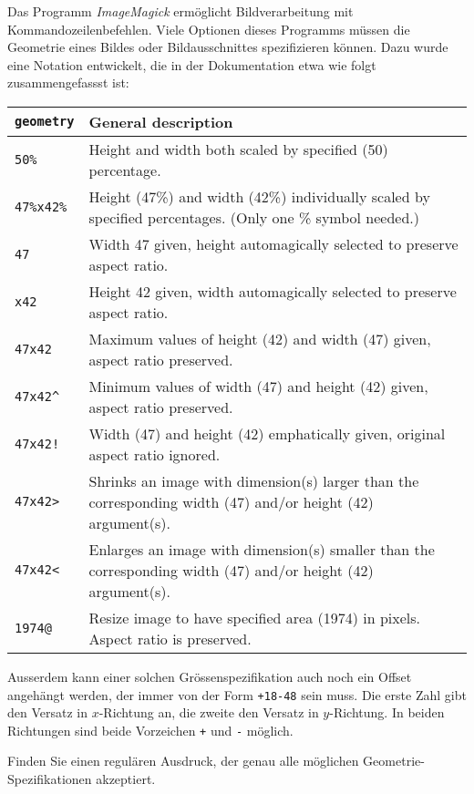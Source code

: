 Das Programm {\em ImageMagick} ermöglicht Bildverarbeitung mit
Kommandozeilenbefehlen. Viele Optionen dieses Programms müssen die
Geometrie eines Bildes oder Bildausschnittes spezifizieren können.
Dazu wurde eine Notation entwickelt, die in der Dokumentation etwa
wie folgt zusammengefassst ist:
\begin{center}
\begin{tabular}{>{\tt}lp{5.75in}}
\rm geometry&General description\\
\hline
50\%&Height and width both scaled by specified (50) percentage.\\
47\%x42\%&Height (47\%) and width (42\%) individually scaled by specified
percentages. (Only one \% symbol needed.)\\
47&Width 47 given, height automagically selected to preserve aspect ratio.\\
x42&Height 42 given, width automagically selected to preserve aspect ratio.\\
47x42&Maximum values of height (42) and width (47) given, aspect ratio
preserved.\\
47x42\^&Minimum values of width (47) and height (42) given, aspect ratio
preserved.\\
47x42!&Width (47) and height (42) emphatically given, original
aspect ratio ignored.\\
47x42>&Shrinks an image with dimension(s) larger than the
corresponding width (47) and/or height (42) argument(s).\\
47x42<&Enlarges an image with dimension(s) smaller than the
corresponding width (47) and/or height (42) argument(s).\\
1974@&Resize image to have specified area (1974) in pixels. Aspect ratio is
preserved.\\
\hline
\end{tabular}
\end{center}
Ausserdem kann einer solchen Grössenspezifikation auch noch ein Offset
angehängt werden, der immer von der Form
\texttt{+18-48}
sein muss. Die erste Zahl gibt den Versatz in $x$-Richtung an, die zweite
den Versatz in $y$-Richtung. In beiden Richtungen sind beide Vorzeichen 
\texttt{+} und \texttt{-} möglich.

Finden Sie einen regulären Ausdruck, der genau alle möglichen
Geometrie-Spezifikationen akzeptiert.


